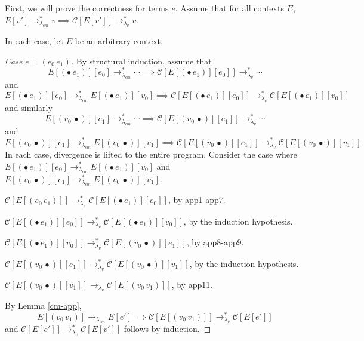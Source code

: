 \documentclass[ms,electronic,twosidetoc,letterpaper,chaptercenter,parttop]{byumsphd}
\newcommand{\lvrr}{\rightarrow_{\lambda_v}}
\newcommand{\lvrrs}{\rightarrow_{\lambda_v}^{*}}
\newcommand{\cmrr}{\rightarrow_{\lambda_{cm}}}
\newcommand{\cmrrs}{\rightarrow_{\lambda_{cm}}^{*}}
\newcommand{\C}[1]{\mathcal{C}[#1]}
\newcommand{\app}[2]{(#1\,#2)}
\newcommand{\hole}{\bullet}
\begin{document}
First, we will prove the correctness for terms $e$. Assume that for all contexts $E$,
$E[v']\cmrrs v\implies\C{E[v']}\lvrrs v$.

In each case, let $E$ be an arbitrary context.

\begin{proof}[Case $e=\app{e_0}{e_1}$]
By structural induction, assume that 
\[
E[\app{\hole}{e_1}][e_0]\cmrrs\cdots\implies\C{E[\app{\hole}{e_1}][e_0]}\lvrrs\cdots
\]
and
\[
E[\app{\hole}{e_1}][e_0]\cmrrs E[\app{\hole}{e_1}][v_0]\implies\C{E[\app{\hole}{e_1}][e_0]}\lvrrs\C{E[\app{\hole}{e_1}][v_0]}
\]
and similarly
\[
E[\app{v_0}{\hole}][e_1]\cmrrs\cdots\implies\C{E[\app{v_0}{\hole}][e_1]}\lvrrs\cdots
\]
and
\[
E[\app{v_0}{\hole}][e_1]\cmrrs E[\app{v_0}{\hole}][v_1]\implies\C{E[\app{v_0}{\hole}][e_1]}\lvrrs\C{E[\app{v_0}{\hole}][v_1]}
\]
In each case, divergence is lifted to the entire program. Consider the case where $E[\app{\hole}{e_1}][e_0]\cmrrs E[\app{\hole}{e_1}][v_0]$ and $E[\app{v_0}{\hole}][e_1]\cmrrs E[\app{v_0}{\hole}][v_1]$.

$\C{E[\app{e_0}{e_1}]}\lvrrs\C{E[\app{\hole}{e_1}][e_0]}$, by app1-app7.

$\C{E[\app{\hole}{e_1}][e_0]}\lvrrs\C{E[\app{\hole}{e_1}][v_0]}$, by the induction hypothesis.

$\C{E[\app{\hole}{e_1}][v_0]}\lvrrs\C{E[\app{v_0}{\hole}][e_1]}$, by app8-app9.

$\C{E[\app{v_0}{\hole}][e_1]}\lvrrs\C{E[\app{v_0}{\hole}][v_1]}$, by the induction hypothesis.

$\C{E[\app{v_0}{\hole}][v_1]}\lvrr\C{E[\app{v_0}{v_1}]}$, by app11.

By Lemma \ref{cm-app},
\[
E[\app{v_0}{v_1}]\cmrr E[e']\implies\C{E[\app{v_0}{v_1}]}\lvrrs\C{E[e']}
\]
and $\C{E[e']}\lvrrs\C{E[v']}$ follows by induction.
\end{proof}
\end{document}

